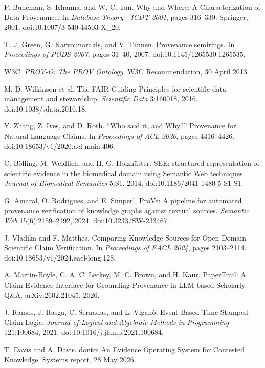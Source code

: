  P. Buneman, S. Khanna, and W.-C. Tan. Why and Where: A Characterization of Data Provenance. In \emph{Database Theory---ICDT 2001}, pages 316--330. Springer, 2001. doi:10.1007/3-540-44503-X\_20.

 T. J. Green, G. Karvounarakis, and V. Tannen. Provenance semirings. In \emph{Proceedings of PODS 2007}, pages 31--40, 2007. doi:10.1145/1265530.1265535.

 W3C. \emph{PROV-O: The PROV Ontology}. W3C Recommendation, 30 April 2013.

 M. D. Wilkinson et al. The FAIR Guiding Principles for scientific data management and stewardship. \emph{Scientific Data} 3:160018, 2016. doi:10.1038/sdata.2016.18.

 Y. Zhang, Z. Ives, and D. Roth. ``Who said it, and Why?'' Provenance for Natural Language Claims. In \emph{Proceedings of ACL 2020}, pages 4416--4426. doi:10.18653/v1/2020.acl-main.406.

 C. B\"olling, M. Weidlich, and H.-G. Holzh\"utter. SEE: structured representation of scientific evidence in the biomedical domain using Semantic Web techniques. \emph{Journal of Biomedical Semantics} 5:S1, 2014. doi:10.1186/2041-1480-5-S1-S1.

 G. Amaral, O. Rodrigues, and E. Simperl. ProVe: A pipeline for automated provenance verification of knowledge graphs against textual sources. \emph{Semantic Web} 15(6):2159--2192, 2024. doi:10.3233/SW-233467.

 J. Vladika and F. Matthes. Comparing Knowledge Sources for Open-Domain Scientific Claim Verification. In \emph{Proceedings of EACL 2024}, pages 2103--2114. doi:10.18653/v1/2024.eacl-long.128.

 A. Martin-Boyle, C. A. C. Leckey, M. C. Brown, and H. Kaur. PaperTrail: A Claim-Evidence Interface for Grounding Provenance in LLM-based Scholarly Q\&A. arXiv:2602.21045, 2026.

 J. Ramos, J. Rasga, C. Sernadas, and L. Vigan\`o. Event-Based Time-Stamped Claim Logic. \emph{Journal of Logical and Algebraic Methods in Programming} 121:100684, 2021. doi:10.1016/j.jlamp.2021.100684.

 T. Davis and A. Davis. donto: An Evidence Operating System for Contested Knowledge. Systems report, 28 May 2026.

